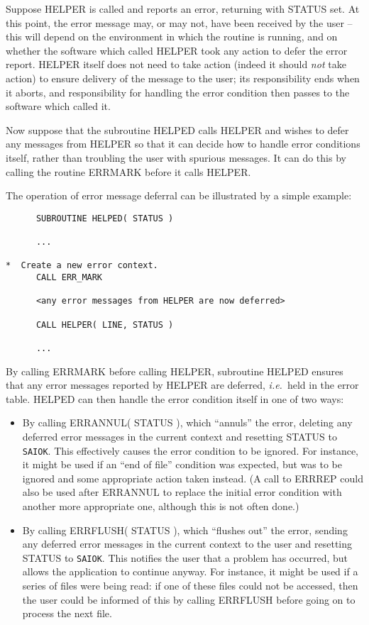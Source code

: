 \documentclass[twoside,11pt]{article}
\renewcommand{\_}{\texttt{\symbol{95}}}
\newcommand{\const}[1]{\texttt{#1}}
\newcommand{\saiok}{\const{SAI\_\_OK}}
\begin{document}
Suppose HELPER is called and reports an error, returning with STATUS set.
At this point, the error message may, or may not, have been received by the
user -- this will depend on the environment in which the routine is running,
and on whether the software which called HELPER took any action to defer the
error report. 
HELPER itself does not need to take action (indeed it should \emph{not} take 
action) to ensure delivery of the message to the user; its responsibility 
ends when it aborts, and responsibility for handling the error condition then
passes to the software which called it. 

Now suppose that the subroutine HELPED calls HELPER and wishes to defer any
messages from HELPER so that it can decide how to handle error conditions
itself, rather than troubling the user with spurious messages. 
It can do this by calling the routine ERR\_MARK before it calls HELPER.

The operation of error message deferral can be illustrated by a simple
example:

\begin {small}
\begin{verbatim}
      SUBROUTINE HELPED( STATUS )

      ...

*  Create a new error context.
      CALL ERR_MARK

      <any error messages from HELPER are now deferred>

      CALL HELPER( LINE, STATUS )

      ...
\end{verbatim}
\end {small}

By calling ERR\_MARK before calling HELPER, subroutine HELPED ensures that any
error  messages reported by HELPER are deferred, \textit{i.e.}\ held in the error table.
HELPED can then handle the error condition itself in one of two ways:

\begin {itemize}
\item By calling ERR\_ANNUL( STATUS ), which ``annuls'' the error, deleting 
any deferred error messages in the current context and resetting STATUS to 
\saiok.
This effectively causes the error condition to be ignored.
For instance, it might be used if an ``end of file'' condition was expected, 
but was to be ignored and some appropriate action taken instead.
(A call to ERR\_REP could also be used after ERR\_ANNUL to replace the 
initial error condition with another more appropriate one, although this is
not often done.) 

\item By calling ERR\_FLUSH( STATUS ), which ``flushes out'' the error, 
sending any deferred error messages in the current context to the user and
resetting STATUS to \saiok. 
This notifies the user that a problem has occurred, but allows the 
application to continue anyway.
For instance, it might be used if a series of files were being read: if one
of these files could not be accessed, then the user could be informed of
this by calling ERR\_FLUSH before going on to process the next file. 
\end{itemize}
\end{document}
